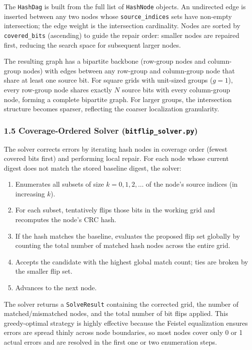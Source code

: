 The \texttt{HashDag} is built from the full list of \texttt{HashNode} objects.
An undirected edge is inserted between any two nodes whose \texttt{source\_indices} sets have non-empty intersection; the edge weight is the intersection cardinality.
Nodes are sorted by \texttt{covered\_bits} (ascending) to guide the repair order: smaller nodes are repaired first, reducing the search space for subsequent larger nodes.

The resulting graph has a bipartite backbone (row-group nodes and column-group nodes) with edges between any row-group and column-group node that share at least one source bit.
For square grids with unit-sized groups ($g=1$), every row-group node shares exactly $N$ source bits with every column-group node, forming a complete bipartite graph.
For larger groups, the intersection structure becomes sparser, reflecting the coarser localization granularity.

\subsubsection*{1.5 Coverage-Ordered Solver (\texttt{bitflip\_solver.py})}

The solver corrects errors by iterating hash nodes in coverage order (fewest covered bits first) and performing local repair.
For each node whose current digest does not match the stored baseline digest, the solver:

\begin{enumerate}
    \item Enumerates all subsets of size $k = 0, 1, 2, \ldots$ of the node's source indices (in increasing $k$).
    \item For each subset, tentatively flips those bits in the working grid and recomputes the node's CRC hash.
    \item If the hash matches the baseline, evaluates the proposed flip set globally by counting the total number of matched hash nodes across the entire grid.
    \item Accepts the candidate with the highest global match count; ties are broken by the smaller flip set.
    \item Advances to the next node.
\end{enumerate}

The solver returns a \texttt{SolveResult} containing the corrected grid, the number of matched/mismatched nodes, and the total number of bit flips applied.
This greedy-optimal strategy is highly effective because the Feistel equalization ensures errors are spread thinly across node boundaries, so most nodes cover only 0 or 1 actual errors and are resolved in the first one or two enumeration steps.


